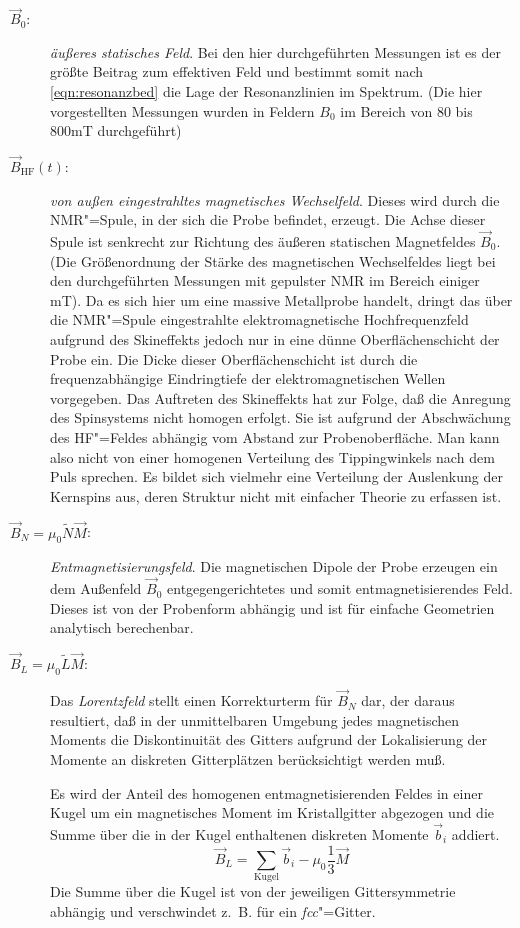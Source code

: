 \begin{description}
	\item[$\vec B_0$:] \emph{äußeres statisches Feld}. Bei den hier durchgeführten Messungen ist es
		der größte Beitrag zum effektiven Feld und bestimmt somit nach \eqref{eqn:resonanzbed} die Lage der Resonanzlinien im
		Spektrum. (Die hier vorgestellten Messungen wurden in Feldern $B_0$ im Bereich von 80 bis 800mT
		durchgeführt) 
	\item[$\vec B_\mathrm{HF}(t)$:] \emph{von außen eingestrahltes magnetisches Wechselfeld}.
		Dieses wird durch die NMR"=Spule, in der sich die Probe befindet, erzeugt. Die
		Achse dieser Spule ist senkrecht zur Richtung des äußeren statischen Magnetfeldes $\vec
		B_0$. (Die Größenordnung der Stärke des magnetischen Wechselfeldes liegt bei den
		durchgeführten Messungen mit gepulster NMR im Bereich einiger mT). Da es sich hier um eine
		massive Metallprobe handelt, dringt das über die NMR"=Spule eingestrahlte
		elektromagnetische Hochfrequenzfeld aufgrund des Skineffekts jedoch nur in
		eine dünne Oberflächenschicht der Probe ein. Die Dicke dieser Oberflächenschicht ist durch die frequenzabhängige Eindringtiefe
		der elektromagnetischen Wellen vorgegeben. Das Auftreten des Skineffekts hat zur Folge, daß die Anregung des
		Spinsystems nicht homogen erfolgt. Sie ist aufgrund der Abschwächung des HF"=Feldes abhängig vom Abstand zur Probenoberfläche.
		Man kann also nicht von einer homogenen Verteilung des Tippingwinkels nach dem Puls
		sprechen. Es bildet sich vielmehr eine Verteilung der Auslenkung der Kernspins
		aus, deren Struktur nicht mit einfacher Theorie zu erfassen ist.
	\item[$\vec B_N=\mu_0\tilde{N}\vec M$:] \emph{Entmagnetisierungsfeld}. Die magnetischen Dipole der
		Probe erzeugen ein dem Außenfeld $\vec B_0$ entgegengerichtetes und somit
		entmagnetisierendes Feld. Dieses ist von der Probenform abhängig und ist für einfache
		Geometrien analytisch berechenbar.
	\item[$\vec B_L=\mu_0\tilde{L}\vec M$:] Das \emph{Lorentzfeld} stellt einen Korrekturterm für $\vec B_N$
		dar, der daraus resultiert, daß in der unmittelbaren Umgebung jedes magnetischen Moments
		die Diskontinuität des Gitters aufgrund der Lokalisierung der Momente an diskreten
		Gitterplätzen berücksichtigt werden muß.

		Es wird der Anteil des homogenen entmagnetisierenden Feldes in einer Kugel um
		ein magnetisches Moment im Kristallgitter abgezogen und die Summe
		über die in der Kugel enthaltenen diskreten Momente $\vec b_i$ addiert.
		\begin{equation}
			\vec B_L = \sum_\mathrm{Kugel}\vec b_i - \mu_0\frac13\vec M
		\end{equation}
		Die Summe über die Kugel ist von der jeweiligen Gittersymmetrie abhängig und verschwindet
		z.\ B. für ein \emph{fcc}"=Gitter.


\end{description}
